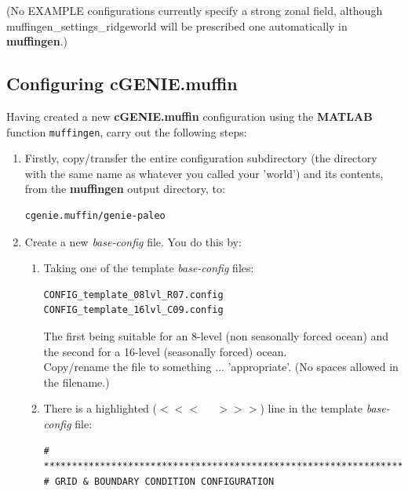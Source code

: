 \documentclass[11pt,fleqn]{book} %
\begin{document}
\noindent (No EXAMPLE configurations currently specify a strong zonal field, although \\\small\textsf{muffingen\_settings\_ridgeworld }\normalsize will be prescribed one automatically in \textbf{muffingen}.) 


\subsection{Configuring cGENIE.muffin}

Having created a new \textbf{cGENIE.muffin} configuration using the \textbf{MATLAB} function \texttt{muffingen}, carry out the following steps:

\vspace{2mm}
\begin{enumerate}
\item Firstly, copy/transfer the entire  configuration subdirectory (the directory with the same name as whatever you called your 'world')  and its contents, from the \textbf{muffingen} output directory, to:
\vspace{-4pt}\begin{verbatim}
cgenie.muffin/genie-paleo
\end{verbatim}\vspace{-4pt}
\item Create a new \textit{base-config} file. You do this by:
\vspace{2mm}
\begin{enumerate}
\item Taking one of the template \textit{base-config} files:
\vspace{-2pt}\begin{verbatim}
CONFIG_template_08lvl_R07.config
CONFIG_template_16lvl_C09.config
\end{verbatim}\vspace{-2pt}
The first being suitable for an 8-level (non seasonally forced ocean) and the second for a 16-level (seasonally forced) ocean.
\\Copy/rename the file to something ... 'appropriate'. (No spaces allowed in the filename.)
\item There is a highlighted (\(<<<\;\;\;\;\;>>>\)) line in the template \textit{base-config} file:
\footnotesize\vspace{-2pt}\begin{verbatim}
# *******************************************************************
# GRID & BOUNDARY CONDITION CONFIGURATION

\end{verbatim}
\end{enumerate}
\end{enumerate}
\end{document}
